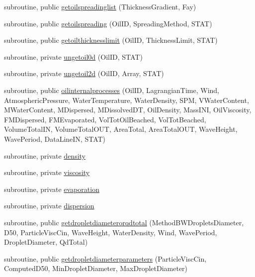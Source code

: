 \begin{DoxyCompactItemize}
\item 
subroutine, public \mbox{\hyperlink{namespacemoduleoil__0d_af81162169a4b962122c4de881bf62957}{getoilspreadinglist}} (Thickness\+Gradient, Fay)
\item 
subroutine, public \mbox{\hyperlink{namespacemoduleoil__0d_af99e71581dc3e88eb79bbabd1712077d}{getoilspreading}} (Oil\+ID, Spreading\+Method, S\+T\+AT)
\item 
subroutine, public \mbox{\hyperlink{namespacemoduleoil__0d_addd445bd0b4ba520f5e73d1d711ce3c6}{getoilthicknesslimit}} (Oil\+ID, Thickness\+Limit, S\+T\+AT)
\item 
subroutine, private \mbox{\hyperlink{namespacemoduleoil__0d_a5e491438effacee8f245a2f293ac1cd5}{ungetoil0d}} (Oil\+ID, S\+T\+AT)
\item 
subroutine, private \mbox{\hyperlink{namespacemoduleoil__0d_a2a561dff5ba878c524c927808595b674}{ungetoil2d}} (Oil\+ID, Array, S\+T\+AT)
\item 
subroutine, public \mbox{\hyperlink{namespacemoduleoil__0d_acfea99e694d76e1358d2a688a3d50d98}{oilinternalprocesses}} (Oil\+ID, Lagrangian\+Time, Wind, Atmospheric\+Pressure, Water\+Temperature, Water\+Density, S\+PM, V\+Water\+Content, M\+Water\+Content, M\+Dispersed, M\+Dissolved\+DT, Oil\+Density, Mass\+I\+NI, Oil\+Viscosity, F\+M\+Dispersed, F\+M\+Evaporated, Vol\+Tot\+Oil\+Beached, Vol\+Tot\+Beached, Volume\+Total\+IN, Volume\+Total\+O\+UT, Area\+Total, Area\+Total\+O\+UT, Wave\+Height, Wave\+Period, Data\+Line\+IN, S\+T\+AT)
\item 
subroutine, private \mbox{\hyperlink{namespacemoduleoil__0d_a365dbbed79663b6925c5964691b6fae2}{density}}
\item 
subroutine, private \mbox{\hyperlink{namespacemoduleoil__0d_aed2374d490605ee4791762d23340c037}{viscosity}}
\item 
subroutine, private \mbox{\hyperlink{namespacemoduleoil__0d_ae6b04a828d4410d4e96bd3d91b7287a1}{evaporation}}
\item 
subroutine, private \mbox{\hyperlink{namespacemoduleoil__0d_acebfecd3789a27099dd53ae338cb4b64}{dispersion}}
\item 
subroutine, public \mbox{\hyperlink{namespacemoduleoil__0d_a2282beabe04942e12608b16eecc58ffe}{getdropletdiameterorqdtotal}} (Method\+B\+W\+Droplets\+Diameter, D50, Particle\+Visc\+Cin, Wave\+Height, Water\+Density, Wind, Wave\+Period, Droplet\+Diameter, Qd\+Total)
\item 
subroutine, public \mbox{\hyperlink{namespacemoduleoil__0d_a5770405ab41d32282fda45ba2d2750ef}{getdropletdiameterparameters}} (Particle\+Visc\+Cin, Computed\+D50, Min\+Droplet\+Diameter, Max\+Droplet\+Diameter)

\end{DoxyCompactItemize}
